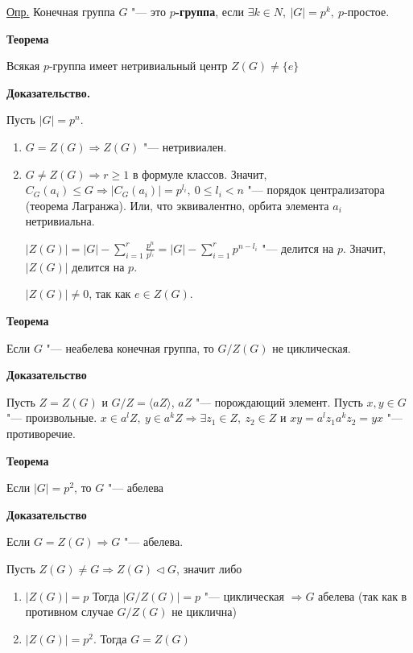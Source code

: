 \documentclass{article}
\begin{document}
\vspace{10pt}

\underline{Опр.} Конечная группа $G$ "--- это \textbf{$p$-группа}, если $\exists k \in N, \  |G| = p^k, \  p$-простое.

\vspace{10pt}

\textbf{Теорема}

Всякая $p$-группа имеет нетривиальный центр $Z(G) \neq \{e\}$

\vspace{5pt}

\textbf{Доказательство.}

Пусть $|G| = p^n$.

\begin{enumerate}
	\item $G = Z(G) \Rightarrow Z(G)$ "--- нетривиален.
	\item $G \neq Z(G) \Rightarrow r \geq 1$ в формуле классов. Значит, $C_G(a_i) \leq G \Rightarrow |C_G(a_i)| = p^{l_i}, \  0 \leq l_i < n$ "--- порядок централизатора (теорема Лагранжа). Или, что эквивалентно, орбита элемента $a_i$ нетривиальна.
	
	$|Z(G)| = |G| - \sum \limits_{i=1}^r \frac{p^n}{p^{l_i}} = |G| - \sum \limits_{i=1}^r p^{n-l_i}$ "--- делится на $p$. Значит, $|Z(G)|$ делится на $p$.
	
	$|Z(G)| \neq 0$, так как $e \in Z(G)$.
\end{enumerate}

\vspace{10pt}

\textbf{Теорема}

Если $G$ "--- неабелева конечная группа, то $G/Z(G)$ не циклическая.

\vspace{5pt}

\textbf{Доказательство}

Пусть $Z = Z(G)$ и $G/Z = \langle aZ \rangle$, $aZ$ "--- порождающий элемент. Пусть $x, y \in G$ "--- произвольные. $x \in a^lZ, \  y \in a^kZ \Rightarrow \exists z_1 \in Z, \  z_2 \in Z$ и $xy = a^lz_1a^kz_2 = yx$ "--- противоречие.

\vspace{10pt}

\textbf{Теорема}

Если $|G| = p^2$, то $G$ "--- абелева

\vspace{5pt}

\textbf{Доказательство}

Если $G = Z(G) \Rightarrow G$ "--- абелева.

Пусть $Z(G) \neq G \Rightarrow Z(G) \triangleleft G$, значит либо
\begin{enumerate}
	\item $|Z(G)| = p$
	Тогда $|G/Z(G)| = p$ "--- циклическая $\Rightarrow G$ абелева (так как в противном случае $G/Z(G)$ не циклична)
	
	\item $|Z(G)| = p^2$. Тогда $G = Z(G)$
\end{enumerate}
\end{document}
